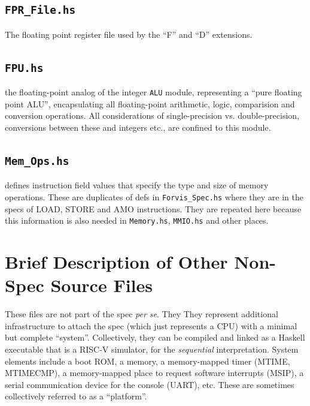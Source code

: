 \documentclass[11pt]{article}
\begin{document}

\subsection{\tt FPR\_File.hs}

The floating point register file used by the ``F'' and ``D'' extensions.


\subsection{\tt FPU.hs}

 the floating-point analog of the integer \verb|ALU|
module, representing a ``pure floating point ALU'', encapsulating all
floating-point arithmetic, logic, comparision and conversion
operations. All considerations of single-precision
vs. double-precision, conversions between these and integers etc., are
confined to this module.


\subsection{\tt Mem\_Ops.hs} defines instruction field values that specify the
type and size of memory operations.  These are duplicates of defs in
\verb|Forvis_Spec.hs| where they are in the specs of LOAD, STORE and
AMO instructions.  They are repeated here because this information is
also needed in \verb|Memory.hs|, \verb|MMIO.hs| and other places.


\section{Brief Description of Other Non-Spec Source Files}

These files are not part of the spec \emph{per se}.  They They
represent additional infrastructure to attach the spec (which just
represents a CPU) with a minimal but complete ``system''.
Collectively, they can be compiled and linked as a Haskell executable
that is a RISC-V simulator, for the \emph{sequential} interpretation.
System elements include a boot ROM, a memory, a memory-mapped timer
(MTIME, MTIMECMP), a memory-mapped place to request software
interrupts (MSIP), a serial communication device for the console
(UART), etc.  These are sometimes collectively referred to as a
``platform''.
\end{document}
